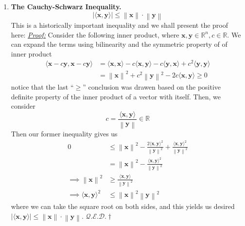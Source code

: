 \documentclass[oneside, 12pt]{book}
\newcommand{\settag}[1]{\renewcommand{\theenumi}{#1}}
\newcommand{\R}{\mathbb{R}}
\newcommand{\real}{\mathbb{R}}
\newcommand{\qed}{\hfill $\mathcal{Q}.\mathcal{E}.\mathcal{D}.\dagger$}
\newcommand{\tbf}[1]{\textbf{#1}}
\newcommand{\tit}[1]{\textit{#1}}
\newcommand{\proof}{\tit{\underline{Proof:}}} %
\newcommand{\norm}[1]{\left\lVert#1\right\rVert}
\newcommand{\para}[1]{\item \tbf{#1}}
\newcommand{\vx}{\mathbf{x}}
\newcommand{\vy}{\mathbf{y}}
\begin{document}
\begin{enumerate}
    \settag{4.3.4-(1)}
    \para{The Cauchy-Schwarz Inequality.}
    \begin{equation*}
        \left|\langle \vx, \vy \rangle\right| \leq \norm{\vx} \cdot \norm{\vy}
    \end{equation*}
    This is a historically important inequality and we shall present the proof here: \newline
    \proof \newline
    Consider the following inner product, where $\vx,\vy\in \R^n, c\in \R$. We can expand the terms
    using bilinearity and the symmetric property of of inner product
    \begin{align*}
        \langle \vx - c\vy,\vx - c\vy \rangle &= \langle \vx,\vx\rangle - c\langle \vx,\vy\rangle
        - c\langle \vy,\vx\rangle + c^2\langle \vy,\vy\rangle \\
        &= \norm{\vx}^2 + c^2\norm{\vy}^2 - 2c\langle \vx,\vy\rangle \geq 0
    \end{align*}
    notice that the last ``$\geq$'' conclusion was drawen based on the positive definite property
    of the inner product of a vector with itself. Then, we consider
    \begin{equation*}
        c = \frac{\langle \vx,\vy \rangle}{\norm{\vy}}\in \real
    \end{equation*}
    Then our former inequality gives us
    \begin{align*}
        0 &\leq \norm{\vx}^2 - \frac{2\langle \vx,\vy\rangle^2}{\norm{\vy}^2} + \frac{\langle \vx,\vy\rangle^2}{\norm{\vy}^2} \\
        &= \norm{\vx}^2 - \frac{\langle \vx,\vy\rangle^2}{\norm{\vy}^2} \\
        \implies \norm{\vx}^2 &\geq \frac{\langle \vx,\vy\rangle}{\norm{\vy}^2} \\
        \implies \langle \vx,\vy\rangle^2 &\leq \norm{\vx}^2\norm{\vy}^2
    \end{align*}
    where we can take the square root on both sides, and this yields us desired 
    $\left|\langle \vx,\vy\rangle\right| \leq \norm{\vx}\cdot \norm{\vy}$. \qed


\end{enumerate}
\end{document}
